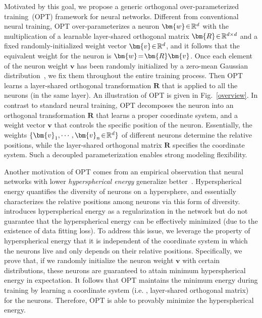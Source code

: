\par

Motivated by this goal, we propose a generic orthogonal over-parameterized training~(OPT) framework for neural networks. Different from conventional neural training, OPT over-parameterizes a neuron $\thickmuskip=2mu \medmuskip=2mu\bm{w}\in\mathbb{R}^{d}$ with the multiplication of a learnable layer-shared orthogonal matrix $\thickmuskip=2mu \medmuskip=2mu\bm{R}\in\mathbb{R}^{d\times d}$ and a fixed randomly-initialized weight vector $\thickmuskip=2mu \medmuskip=2mu \bm{v}\in\mathbb{R}^{d}$, and it follows that the equivalent weight for the neuron is $\thickmuskip=2mu \medmuskip=2mu \bm{w}=\bm{R}\bm{v}$. Once each element of the neuron weight $\bm{v}$ has been randomly initialized by a zero-mean Gaussian distribution~\cite{he2015delving,glorot2010understanding}, we fix them throughout the entire training process. Then OPT learns a layer-shared orthogonal transformation $\bm{R}$ that is applied to all the neurons (in the same layer). An illustration of OPT is given in Fig.~\ref{overview}. In contrast to standard neural training, OPT decomposes the neuron into an orthogonal transformation $\bm{R}$ that learns a proper coordinate system, and a weight vector $\bm{v}$ that controls the specific position of the neuron. Essentially, the weights $\thickmuskip=2mu \medmuskip=2mu \{\bm{v}_1,\cdots,\bm{v}_n\in\mathbb{R}^d\}$ of different neurons determine the relative positions, while the layer-shared orthogonal matrix $\bm{R}$ specifies the coordinate system. Such a decoupled parameterization enables strong modeling flexibility.

\par

Another motivation of OPT comes from an empirical observation that neural networks with lower \emph{hyperspherical energy} generalize better~\cite{liu2018learning}. Hyperspherical energy quantifies the diversity of neurons on a hypersphere, and essentially characterizes the relative positions among neurons via this form of diversity. \cite{liu2018learning} introduces hyperspherical energy as a regularization in the network but do not guarantee that the hyperspherical energy can be effectively minimized (due to the existence of data fitting loss). To address this issue, we leverage the property of hyperspherical energy that it is independent of the coordinate system in which the neurons live and only depends on their relative positions. Specifically, we prove that, if we randomly initialize the neuron weight $\bm{v}$ with certain distributions, these neurons are guaranteed to attain minimum hyperspherical energy in expectation. It follows that OPT maintains the minimum energy during training by learning a coordinate system (i.e. , layer-shared orthogonal matrix) for the neurons. Therefore, OPT is able to provably minimize the hyperspherical energy.
\par

